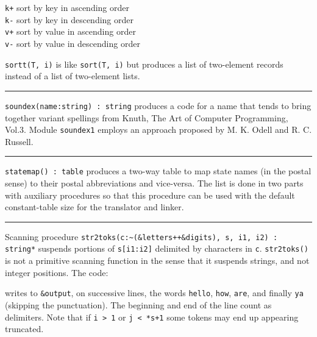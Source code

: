 \texttt{{\textquotedbl}k+{\textquotedbl}} sort by key in ascending
order\\
\texttt{{\textquotedbl}k-{\textquotedbl}} sort by key in descending
order\\
\texttt{{\textquotedbl}v+{\textquotedbl}} sort by value in ascending
order\\
\texttt{{\textquotedbl}v-{\textquotedbl}} sort by value in descending
order

\texttt{sortt}\texttt{(T, i)} is like \texttt{sort(T, i)}
but produces a list of two-element records instead of a list of
two-element lists.

\vspace{0.25cm}\hrule{}

\texttt{soundex(name:string) : string} produces a code for a name that
tends to bring together variant spellings from Knuth, The Art
of Computer Programming, Vol.3.
Module \texttt{soundex1} employs an approach proposed by M. K.
Odell and R. C. Russell.

\vspace{0.25cm}\hrule{}

\texttt{statemap() : table} produces a
{\textquotedbl}two-way{\textquotedbl} table to map state names (in the postal sense) to their postal abbreviations
and vice-versa. The list is done in two parts with auxiliary procedures
so that this procedure can be used with the default constant-table size
for the translator and linker. 

\vspace{0.25cm}\hrule{}

Scanning procedure \texttt{str2toks(c:\~{}(\&letters++\&digits),
s, i1, i2) : string*} suspends portions of \texttt{s[i1:i2]} delimited
by characters in \texttt{c}. \texttt{str2toks()} is not a primitive
scanning function in the sense that it suspends strings, and not
integer positions. The code:


\noindent writes to \texttt{\&output}, on successive lines, the words
\texttt{{\textquotedbl}hello{\textquotedbl}},
\texttt{{\textquotedbl}how{\textquotedbl}},
\texttt{{\textquotedbl}are{\textquotedbl}}, and finally
\texttt{{\textquotedbl}ya{\textquotedbl}} (skipping the punctuation).
The beginning and end of the line count as delimiters. Note
that if \texttt{i {\textgreater} 1} or \texttt{j {\textless} *s+1} some
tokens may end up appearing truncated.

